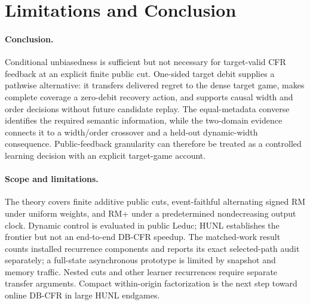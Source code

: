 \section{Limitations and Conclusion}
\label{sec:limitations}

\paragraph{Conclusion.}
Conditional unbiasedness is sufficient but not necessary for target-valid CFR
feedback at an explicit finite public cut.  One-sided target debit supplies a
pathwise alternative: it transfers delivered regret to the dense target game,
makes complete coverage a zero-debit recovery action, and supports causal
width and order decisions without future candidate replay.  The equal-metadata
converse identifies the required semantic information, while the two-domain
evidence connects it to a width/order crossover and a held-out dynamic-width
consequence.  Public-feedback granularity can therefore be treated as a
controlled learning decision with an explicit target-game account.

\paragraph{Scope and limitations.}
The theory covers finite additive public cuts, event-faithful alternating
signed RM under uniform weights, and RM+ under a predetermined nondecreasing
output clock.  Dynamic control is evaluated in public Leduc; HUNL establishes
the frontier but not an end-to-end DB-CFR speedup.  The matched-work result
counts installed recurrence components and reports its exact selected-path
audit separately; a full-state asynchronous prototype is limited by snapshot
and memory traffic.  Nested cuts and other learner recurrences require separate
transfer arguments.  Compact within-origin factorization is the next step
toward online DB-CFR in large HUNL endgames.

